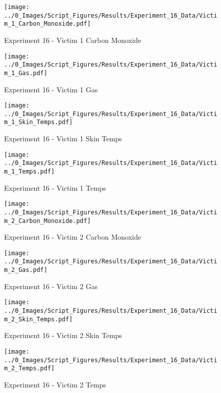 	\begin{figure}[H]
		\centering
		\texttt{[image: ../0\_Images/Script\_Figures/Results/Experiment\_16\_Data/Victim\_1\_Carbon\_Monoxide.pdf]}
		\caption[]{Experiment 16 - Victim 1 Carbon Monoxide}
	\end{figure}
 
	\clearpage

	\begin{figure}[H]
		\centering
		\texttt{[image: ../0\_Images/Script\_Figures/Results/Experiment\_16\_Data/Victim\_1\_Gas.pdf]}
		\caption[]{Experiment 16 - Victim 1 Gas}
	\end{figure}
 

	\begin{figure}[H]
		\centering
		\texttt{[image: ../0\_Images/Script\_Figures/Results/Experiment\_16\_Data/Victim\_1\_Skin\_Temps.pdf]}
		\caption[]{Experiment 16 - Victim 1 Skin Temps}
	\end{figure}
 
	\clearpage

	\begin{figure}[H]
		\centering
		\texttt{[image: ../0\_Images/Script\_Figures/Results/Experiment\_16\_Data/Victim\_1\_Temps.pdf]}
		\caption[]{Experiment 16 - Victim 1 Temps}
	\end{figure}
 

	\begin{figure}[H]
		\centering
		\texttt{[image: ../0\_Images/Script\_Figures/Results/Experiment\_16\_Data/Victim\_2\_Carbon\_Monoxide.pdf]}
		\caption[]{Experiment 16 - Victim 2 Carbon Monoxide}
	\end{figure}
 
	\clearpage

	\begin{figure}[H]
		\centering
		\texttt{[image: ../0\_Images/Script\_Figures/Results/Experiment\_16\_Data/Victim\_2\_Gas.pdf]}
		\caption[]{Experiment 16 - Victim 2 Gas}
	\end{figure}
 

	\begin{figure}[H]
		\centering
		\texttt{[image: ../0\_Images/Script\_Figures/Results/Experiment\_16\_Data/Victim\_2\_Skin\_Temps.pdf]}
		\caption[]{Experiment 16 - Victim 2 Skin Temps}
	\end{figure}
 
	\clearpage

	\begin{figure}[H]
		\centering
		\texttt{[image: ../0\_Images/Script\_Figures/Results/Experiment\_16\_Data/Victim\_2\_Temps.pdf]}
		\caption[]{Experiment 16 - Victim 2 Temps}
	\end{figure}
 


